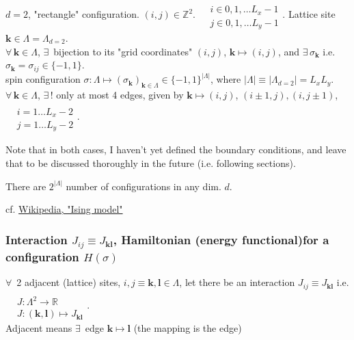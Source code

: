 \documentclass[10pt]{amsart}
\begin{document}
\begin{multicols*}{2}
$d=2$, "rectangle" configuration.  $(i,j) \in \mathbb{Z}^2$.   $\begin{aligned} & \quad \\ 
&	 i \in 0,1,\dots L_x-1 \\ 
&	 j \in 0,1,\dots L_y-1 \end{aligned}$.  Lattice site $\mathbf{k} \in \Lambda = \Lambda_{d=2}$.  \\ $\forall \, \mathbf{k} \in \Lambda$, $\exists \, $ bijection to its "grid coordinates" $(i,j)$, $\mathbf{k} \mapsto (i,j)$, and $\exists \, \sigma_{\mathbf{k}} $ i.e. $\sigma_{\mathbf{k}} = \sigma_{ij} \in \lbrace -1,1\rbrace$.  \\
spin configuration $\sigma: \Lambda \mapsto (\sigma_{\mathbf{k}})_{\mathbf{k} \in \Lambda} \in \lbrace -1,1\rbrace^{|\Lambda|}$, where $|\Lambda | \equiv |\Lambda_{d=2} | = L_xL_y$.  \\
$\forall \, \mathbf{k} \in \Lambda$, $\exists \, !$ only at most 4 edges, given by $\mathbf{k} \mapsto (i,j)$, $(i \pm 1, j ), (i,j\pm 1)$, \  $\begin{aligned} & \quad \\ & i = 1\dots L_x -2 \\ & j = 1\dots L_y-2 \end{aligned}$.  

Note that in both cases, I haven't yet defined the boundary conditions, and leave that to be discussed thoroughly in the future (i.e. following sections).  

There are $2^{|\Lambda|}$ number of configurations in any dim. $d$.  

cf. \href{https://en.wikipedia.org/wiki/Ising_model}{Wikipedia, "Ising model"}

\subsubsection{Interaction $J_{ij} \equiv J_{\mathbf{k} \mathbf{l}}$, Hamiltonian (energy functional)for a configuration $H(\sigma)$}  

$\forall \, $ 2 adjacent (lattice) sites, $i,j \equiv \mathbf{k}, \mathbf{l} \in \Lambda$, let there be an interaction $J_{ij} \equiv J_{\mathbf{k} \mathbf{l}}$ i.e. $\begin{aligned} & \quad \\ 
& J : \Lambda^2 \to \mathbb{R} \\ 
& J: (\mathbf{k}, \mathbf{l}) \mapsto J_{\mathbf{k} \mathbf{l}} \end{aligned}$.   \\
Adjacent means $\exists \, $ edge $\mathbf{k} \mapsto \mathbf{l}$ (the mapping is the edge)  


\end{multicols*}
\end{document}
